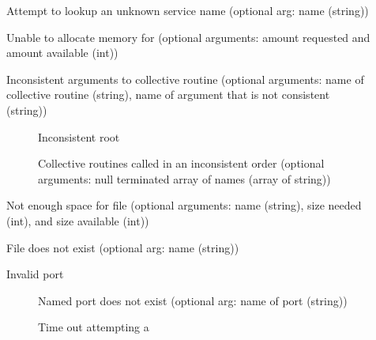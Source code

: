 \begin{description}
\item[]Attempt to lookup an unknown service name
  (optional arg: name (string))
\item[]Unable to allocate memory for
   (optional arguments: amount requested and amount
  available (int))
\item[]Inconsistent arguments to collective routine
(optional arguments: name of collective routine (string), name of argument
that is not consistent (string))
    \begin{description}
    \item[]Inconsistent root
    \item[]Collective routines
      called in an inconsistent order (optional arguments: null terminated
      array of names (array of string))
    \end{description}
\item[]Not enough space for file (optional
  arguments: name (string), size needed (int), and size available (int))
\item[]File does not exist (optional arg: name (string))
\item[]Invalid port
    \begin{description}
    \item[]Named port does not exist (optional
      arg: name of port (string))
    \item[]Time out attempting a

\end{description}
\end{description}
